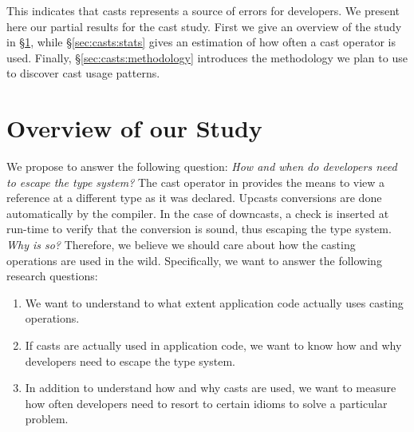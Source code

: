 
This indicates that casts represents a source of errors for developers.
We present here our partial results for the cast study.
First we give an overview of the study in \S\ref{sec:casts:overview},
while \S\ref{sec:casts:stats} gives an estimation of how often a cast operator is used.
Finally, \S\ref{sec:casts:methodology} introduces the methodology we plan to use to discover cast usage patterns.

\section{Overview of our Study}
\label{sec:casts:overview}

We propose to answer the following question:
\emph{How and when do developers need to escape the type system?}
The cast operator in \java{} provides the means to view a reference at a different type as it was declared.
Upcasts conversions are done automatically by the compiler.
In the case of downcasts, a check is inserted at run-time to verify that the conversion is sound, thus escaping the type system.
\emph{Why is so?}
Therefore, we believe we should care about how the casting operations are used in the wild.
Specifically, we want to answer the following research questions:

\begin{enumerate}[label=$CRQ\arabic*:$,ref=$CRQ\arabic*$,leftmargin=3.4\parindent]
\item\label{enum:rq1}{\bf \crqA}
We want to understand to what extent application code actually uses casting operations.
\item\label{enum:rq2}{\bf \crqB}
If casts are actually used in application code, we want to know how and why developers need to escape the type system.
\item\label{enum:rq3}{\bf \crqC}
In addition to understand how and why casts are used, we want to measure how often developers need to resort to certain idioms to solve a particular problem.
\end{enumerate}

